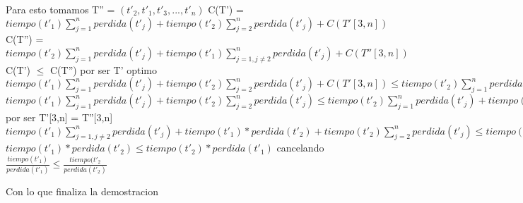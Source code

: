 Para esto tomamos T'' = $(t'_2,t'_1,t'_3,...,t'_n)$
C(T') = $tiempo(t'_1) \sum_{j=1}^{n}perdida(t'_j) + tiempo(t'_2) \sum_{j=2}^{n}perdida(t'_j) + C(T'[3,n]) $
C(T'') = $tiempo(t'_2) \sum_{j=1}^{n}perdida(t'_j) + tiempo(t'_1) \sum_{j=1,j\neq 2}^{n}perdida(t'_j) + C(T''[3,n]) $
C(T') $\leq$ C(T'') por ser T' optimo
$tiempo(t'_1) \sum_{j=1}^{n}perdida(t'_j) + tiempo(t'_2) \sum_{j=2}^{n}perdida(t'_j) + C(T'[3,n]) \leq tiempo(t'_2) \sum_{j=1}^{n}perdida(t'_j) + tiempo(t'_1) \sum_{j=1,j\neq 2}^{n}perdida(t'_j) + C(T''[3,n])$
$tiempo(t'_1) \sum_{j=1}^{n}perdida(t'_j) + tiempo(t'_2) \sum_{j=2}^{n}perdida(t'_j)  \leq tiempo(t'_2) \sum_{j=1}^{n}perdida(t'_j) + tiempo(t'_1) \sum_{j=1,j\neq 2}^{n}perdida(t'_j) $ por ser T'[3,n] = T''[3,n]
$tiempo(t'_1) \sum_{j=1,j\neq 2}^{n}perdida(t'_j) + tiempo(t'_1) * perdida(t'_2) + tiempo(t'_2) \sum_{j=2}^{n}perdida(t'_j) \leq tiempo(t'_1) \sum_{j=1,j\neq 2}^{n}perdida(t'_j) + tiempo(t'_2) \sum_{j=2}^{n}perdida(t'_j)+ tiempo(t'_2) * perdida(t'_1)$  
$tiempo(t'_1) * perdida(t'_2) \leq tiempo(t'_2) * perdida(t'_1) $ cancelando
$\frac{tiempo(t'_1)}{perdida(t'_1)} \leq \frac{tiempo(t'_2}{perdida(t'_2)}$

Con lo que finaliza la demostracion



